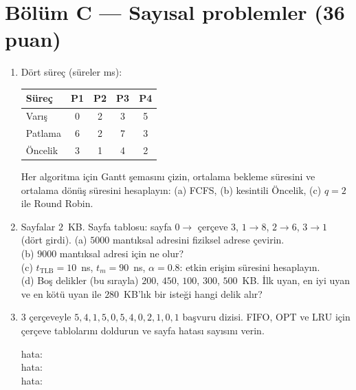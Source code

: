 \documentclass[11pt,a4paper]{article}
\begin{document}
\section*{Bölüm C --- Sayısal problemler \hfill (36 puan)}
\begin{enumerate}[leftmargin=1.8em,label=C\arabic*.]
  \item Dört süreç (süreler ms):
  \begin{center}
  \begin{tabular}{lcccc}
  \toprule
  Süreç & P1 & P2 & P3 & P4 \\ \midrule
  Varış & 0 & 2 & 3 & 5 \\
  Patlama & 6 & 2 & 7 & 3 \\
  Öncelik & 3 & 1 & 4 & 2 \\ \bottomrule
  \end{tabular}
  \end{center}
  Her algoritma için Gantt şemasını çizin, ortalama bekleme süresini ve ortalama dönüş süresini hesaplayın: (a) FCFS, (b) kesintili Öncelik, (c) $q = 2$ ile Round Robin. 
  \ans{4.6cm}
  \item Sayfalar $2$~KB. Sayfa tablosu: sayfa $0 \to$ çerçeve $3$, $1 \to 8$, $2 \to 6$, $3 \to 1$ (dört girdi).
  (a) $5000$ mantıksal adresini fiziksel adrese çevirin. \\
  (b) $9000$ mantıksal adresi için ne olur? \\
  (c) $t_{\text{TLB}} = 10$~ns, $t_m = 90$~ns, $\alpha = 0.8$: etkin erişim süresini hesaplayın. \\
  (d) Boş delikler (bu sırayla) $200$, $450$, $100$, $300$, $500$~KB. İlk uyan, en iyi uyan ve en kötü uyan ile $280$~KB'lık bir isteği hangi delik alır? 
  \ans{5.2cm}
  \item $3$ çerçeveyle $5, 4, 1, 5, 0, 5, 4, 0, 2, 1, 0, 1$ başvuru dizisi. FIFO, OPT ve LRU için çerçeve tablolarını doldurun ve sayfa hatası sayısını verin. 
  \begin{center}
  \small\renewcommand{\arraystretch}{1.2}
  \quad hata: \underline{\hspace{1.2cm}}\\[0.5em]
  \quad hata: \underline{\hspace{1.2cm}}\\[0.5em]
  \quad hata: \underline{\hspace{1.2cm}}
  \end{center}

\end{enumerate}
\end{document}
